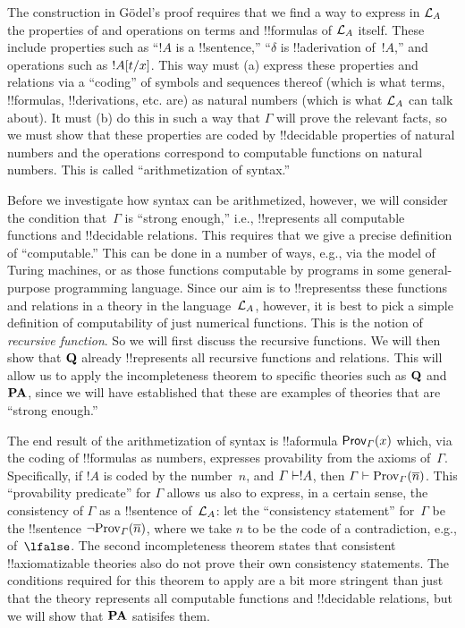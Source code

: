 \documentclass[../../../include/open-logic-section]{subfiles}
\begin{document}
The construction in G\"odel's proof requires that we find a way to
express in $\Lang L_A$ the properties of and operations on terms and
!!{formula}s of $\Lang L_A$ itself. These include properties such as
``$!A$ is a !!{sentence},'' ``$\delta$ is !!a{derivation} of~$!A$,''
and operations such as $!A[t/x]$.  This way must (a) express
these properties and relations via a ``coding'' of symbols and
sequences thereof (which is what terms, !!{formula}s, !!{derivation}s,
etc. are) as natural numbers (which is what $\Lang L_A$ can talk
about). It must (b) do this in such a way that $\Gamma$ will prove the
relevant facts, so we must show that these properties are coded by
!!{decidable} properties of natural numbers and the operations
correspond to computable functions on natural numbers. This is called
``arithmetization of syntax.''

Before we investigate how syntax can be arithmetized, however, we will
consider the condition that~$\Gamma$ is ``strong enough,'' i.e.,
!!{represents} all computable functions and !!{decidable} relations.
This requires that we give a precise definition of ``computable.''
This can be done in a number of ways, e.g., via the model of Turing
machines, or as those functions computable by programs in some
general-purpose programming language.  Since our aim is to
!!{represents}s these functions and relations in a theory in the
language~$\Lang L_A$, however, it is best to pick a simple definition
of computability of just numerical functions.  This is the notion of
\emph{recursive function}.  So we will first discuss the recursive
functions. We will then show that $\mathbf{Q}$ already !!{represents} all
recursive functions and relations.  This will allow us to apply the
incompleteness theorem to specific theories such as $\mathbf{Q}$ and
$\mathbf{PA}$, since we will have established that these are examples of
theories that are ``strong enough.''

The end result of the arithmetization of syntax is
!!a{formula} $\OProv[\Gamma](x)$ which, via the coding of !!{formula}s
as numbers, expresses provability from the axioms of~$\Gamma$.
Specifically, if $!A$ is coded by the number~$n$, and $\Gamma \Proves
!A$, then $\Gamma \Proves \Prov[\Gamma](\num{n})$.  This ``provability
predicate'' for $\Gamma$ allows us also to express, in a certain
sense, the consistency of $\Gamma$ as a !!{sentence} of~$\Lang L_A$:
let the ``consistency statement'' for~$\Gamma$ be the !!{sentence}
$\lnot \Prov[\Gamma](\num{n})$, where we take $n$ to be the code of a
contradiction, e.g., of~$\lfalse$.  The second incompleteness theorem
states that consistent !!{axiomatizable} theories also do not prove
their own consistency statements.  The conditions required for this
theorem to apply are a bit more stringent than just that the theory
represents all computable functions and !!{decidable} relations, but
we will show that $\mathbf{PA}$ satisifes them.
\end{document}
